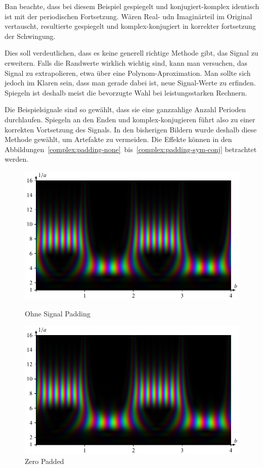 Ban beachte, dass bei diesem Beispiel gespiegelt und konjugiert-komplex identisch ist mit der periodischen Fortsetzung.
Wären Real- udn Imaginärteil im Original vertauscht, resultierte gespiegelt und komplex-konjugiert in korrekter fortsetzung der Schwingung.

Dies soll verdeutlichen, dass es keine generell richtige Methode gibt, das Signal zu erweitern.
Falls die Randwerte wirklich wichtig sind, kann man versuchen, das Signal zu extrapolieren, etwa über eine Polynom-Aproximation.
Man sollte sich jedoch im Klaren sein, dass man gerade dabei ist, neue Signal-Werte zu erfinden.
Spiegeln ist deshalb meist die bevorzugte Wahl bei leistungsstarken Rechnern.

Die Beispielsignale sind so gewählt, dass sie eine ganzzahlige Anzahl Perioden durchlaufen. 
Spiegeln an den Enden und komplex-konjugieren führt also zu einer korrekten Vortsetzung des Signals.
In den bisherigen Bildern wurde deshalb diese Methode gewählt, um Artefakte zu vermeiden.
Die Effekte können in den Abbildungen~\ref{complex:padding-none}~bis~\ref{complex:padding-sym-conj} betrachtet werden.
\begin{figure}
	\centering
	\includegraphics[width=\linewidth, keepaspectratio]{papers/complex/images/padding_none.pdf}
	\caption{Ohne Signal Padding} \label{complex:padding-none}
	\includegraphics[width=\linewidth, keepaspectratio]{papers/complex/images/padding_zero.pdf}
	\caption{Zero Padded} \label{complex:padding-zero}
\end{figure}
